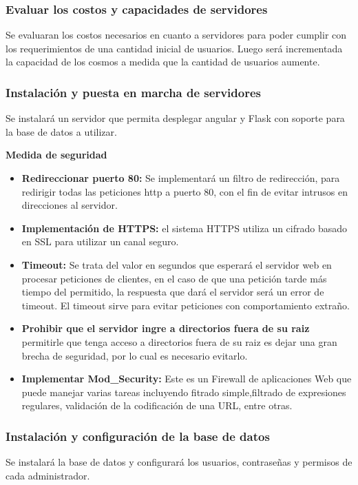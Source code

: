 \documentclass[a4paper,12pt]{article}
\begin{document}
\subsubsection{Evaluar los costos y capacidades de servidores}
Se evaluaran los costos necesarios en cuanto a servidores para poder  cumplir con los requerimientos de una cantidad inicial de usuarios. Luego será incrementada la capacidad de los cosmos a medida que la cantidad de usuarios aumente. 

\subsubsection{Instalación y puesta en marcha de servidores}
Se instalará un servidor que permita desplegar angular y Flask con soporte para la base de     datos a utilizar. 

\textbf{Medida de seguridad}
\begin{itemize}
	\item \textbf{Redireccionar puerto 80: } Se implementará un filtro de redirección, para redirigir todas las peticiones http a puerto 80, con el fin de evitar intrusos en direcciones al servidor.
	\item \textbf{Implementación de HTTPS: } el sistema HTTPS utiliza un cifrado basado en SSL para utilizar un canal seguro.
	\item \textbf{Timeout: }Se trata del valor en segundos que esperará el servidor web en procesar peticiones de clientes, en el caso de que una petición tarde más tiempo del permitido, la respuesta que dará el servidor será un error de timeout. El timeout sirve para evitar peticiones con comportamiento extraño.
	\item \textbf{Prohibir que el servidor ingre a directorios fuera de su raiz} permitirle que tenga acceso a directorios fuera de su raiz es dejar una gran brecha de seguridad, por lo cual es necesario evitarlo.
	\item \textbf{Implementar Mod\_Security:} Este es un Firewall de aplicaciones Web que puede manejar varias tareas incluyendo fitrado simple,filtrado de expresiones regulares, validación de la codificación de una URL, entre otras.
\end{itemize}

\subsubsection{Instalación y configuración de la base de datos}
	Se instalará la base de datos y configurará los usuarios, contraseñas y permisos de cada administrador.
	
\end{document}
